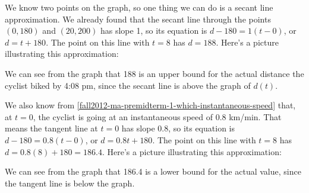 \documentclass{article}
\theoremstyle{theorem}
\begin{document}
\begin{enumerate}
\begin{enumerate}
    \begin{solution} 
      We know two points on the graph, so one thing we can do is a secant line approximation. We already found that the secant line through the points $(0, 180)$ and $(20, 200)$ has slope 1, so its equation is $d - 180 = 1 (t - 0)$, or $d = t + 180$. The point on this line with $t = 8$ has $d = 188$. Here's a picture illustrating this approximation:
      \begin{center}
      \end{center}
      We can see from the graph that 188 is an upper bound for the actual distance the cyclist biked by 4:08 pm, since the secant line is above the graph of $d(t)$.

      We also know from \ref{fall2012-ma-premidterm-1-which-instantaneous-speed} that, at $t = 0$, the cyclist is going at an instantaneous speed of 0.8 km/min. That means the tangent line at $t = 0$ has slope 0.8, so its equation is $d - 180 = 0.8 (t - 0)$, or $d = 0.8 t + 180$. The point on this line with $t = 8$ has $d = 0.8(8) + 180 = 186.4$. Here's a picture illustrating this approximation:
      \begin{center}
      \end{center}
      We can see from the graph that 186.4 is a lower bound for the actual value, since the tangent line is below the graph. 


\end{solution}
\end{enumerate}
\end{enumerate}
\end{document}
